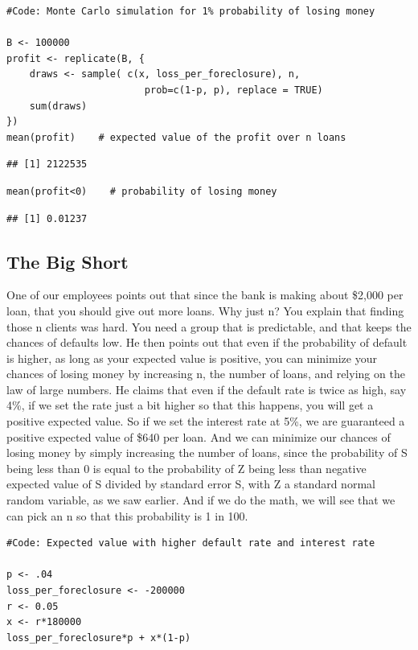 \documentclass[
]{article}
\begin{document}
\begin{verbatim}
#Code: Monte Carlo simulation for 1% probability of losing money

B <- 100000
profit <- replicate(B, {
    draws <- sample( c(x, loss_per_foreclosure), n, 
                        prob=c(1-p, p), replace = TRUE) 
    sum(draws)
})
mean(profit)    # expected value of the profit over n loans
\end{verbatim}

\begin{verbatim}
## [1] 2122535
\end{verbatim}

\begin{verbatim}
mean(profit<0)    # probability of losing money
\end{verbatim}

\begin{verbatim}
## [1] 0.01237
\end{verbatim}

\hypertarget{the-big-short}{%
\subsection{The Big Short}\label{the-big-short}}

One of our employees points out that since the bank is making about
\$2,000 per loan, that you should give out more loans. Why just n? You
explain that finding those n clients was hard. You need a group that is
predictable, and that keeps the chances of defaults low. He then points
out that even if the probability of default is higher, as long as your
expected value is positive, you can minimize your chances of losing
money by increasing n, the number of loans, and relying on the law of
large numbers. He claims that even if the default rate is twice as high,
say 4\%, if we set the rate just a bit higher so that this happens, you
will get a positive expected value. So if we set the interest rate at
5\%, we are guaranteed a positive expected value of \$640 per loan. And
we can minimize our chances of losing money by simply increasing the
number of loans, since the probability of S being less than 0 is equal
to the probability of Z being less than negative expected value of S
divided by standard error S, with Z a standard normal random variable,
as we saw earlier. And if we do the math, we will see that we can pick
an n so that this probability is 1 in 100.

\begin{verbatim}
#Code: Expected value with higher default rate and interest rate

p <- .04
loss_per_foreclosure <- -200000
r <- 0.05
x <- r*180000
loss_per_foreclosure*p + x*(1-p)
\end{verbatim}
\end{document}
